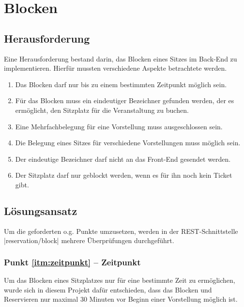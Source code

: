 \section{Blocken}
\label{sec:blocken}
\authorsection{\authorSG}

\subsection{Herausforderung}
\label{ssec:herausforderung_blocken}
\authorsection{\authorSG}
Eine Herausforderung bestand darin, das Blocken eines Sitzes im Back-End zu implementieren. Hierfür mussten verschiedene Aspekte betrachtete werden.

\begin{enumerate}
\label{enum:blocken}
\item \label{itm:zeitpunkt}Das Blocken darf nur bis zu einem bestimmten Zeitpunkt möglich sein.
\item \label{itm:bezeichner}Für das Blocken muss ein eindeutiger Bezeichner gefunden werden, der es ermöglicht, den Sitzplatz für die Veranstaltung zu buchen.
\item \label{itm:mehr_eine_vorstellung}Eine Mehrfachbelegung für eine Vorstellung muss ausgeschlossen sein.
\item \label{itm:mehr_mehrere_vorstellungen}Die Belegung eines Sitzes für verschiedene Vorstellungen muss möglich sein.
\item \label{itm:front_end} Der eindeutige Bezeichner darf nicht an das Front-End gesendet werden.
\item \label{itm:ticket} Der Sitzplatz darf nur geblockt werden, wenn es für ihn noch kein Ticket gibt.
\end{enumerate}

\subsection{Lösungsansatz}
\label{ssec:loesung_blocken}
\authorsection{\authorSG}
Um die geforderten o.g. Punkte umzusetzen, werden in der \acs{REST}-Schnittstelle \jinline |reservation/block| mehrere Überprüfungen durchgeführt.
  
\subsubsection*{Punkt \ref{itm:zeitpunkt} -- Zeitpunkt}
\label{ssssec:Zeitpunkt}
Um das Blocken eines Sitzplatzes nur für eine bestimmte Zeit zu ermöglichen, wurde sich in diesem Projekt dafür entschieden, dass das Blocken und Reservieren nur maximal 30 Minuten vor Beginn einer Vorstellung möglich ist. 

